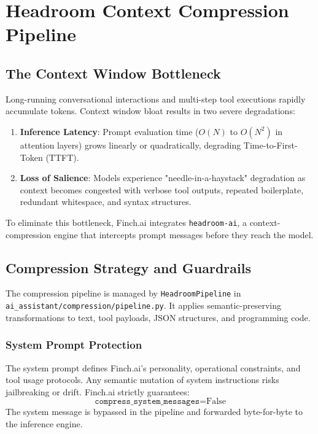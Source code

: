 \chapter{Headroom Context Compression Pipeline}
\label{chap:compression}

\section{The Context Window Bottleneck}
Long-running conversational interactions and multi-step tool executions rapidly accumulate tokens. Context window bloat results in two severe degradations:
\begin{enumerate}
    \item \textbf{Inference Latency}: Prompt evaluation time ($O(N)$ to $O(N^2)$ in attention layers) grows linearly or quadratically, degrading Time-to-First-Token (TTFT).
    \item \textbf{Loss of Salience}: Models experience "needle-in-a-haystack" degradation as context becomes congested with verbose tool outputs, repeated boilerplate, redundant whitespace, and syntax structures.
\end{enumerate}

To eliminate this bottleneck, Finch.ai integrates \texttt{headroom-ai}, a context-compression engine that intercepts prompt messages before they reach the model.

\section{Compression Strategy and Guardrails}
The compression pipeline is managed by \texttt{HeadroomPipeline} in \texttt{ai\_assistant/compression/pipeline.py}. It applies semantic-preserving transformations to text, tool payloads, JSON structures, and programming code.

\subsection{System Prompt Protection}
The system prompt defines Finch.ai's personality, operational constraints, and tool usage protocols. Any semantic mutation of system instructions risks jailbreaking or drift. Finch.ai strictly guarantees:
\begin{equation}
    \texttt{compress\_system\_messages} = \text{False}
\end{equation}
The system message is bypassed in the pipeline and forwarded byte-for-byte to the inference engine.

